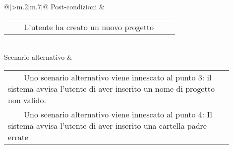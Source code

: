 \begin{longtable}{@{}|>{\centering\arraybackslash}m{.2\textwidth}|m{.7\textwidth}|@{}}
		Post-condizioni & \begin{tabular}{m{0.9\linewidth}}~~\llap{\textbullet}~~L'utente ha creato un nuovo progetto\\\end{tabular}\\
		Scenario alternativo & \begin{tabular}{m{0.9\linewidth}}~~\llap{\textbullet}~~Uno scenario alternativo viene innescato al punto 3: il sistema avvisa l'utente di aver inserito un nome di progetto non valido.\\~~\llap{\textbullet}~~Uno scenario alternativo viene innescato al punto 4: Il sistema avvisa l'utente di aver inserito una cartella padre errate\\\end{tabular}\\\hline
		
	\end{longtable}

